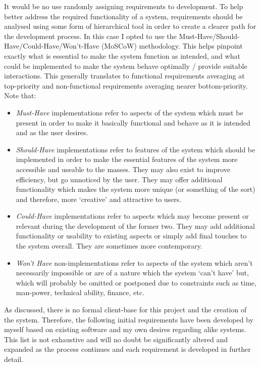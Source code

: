 \documentclass[11pt, english]{article}
\begin{document}
	It would be no use randomly assigning requirements to development. To help better address the required functionality of a system, requirements should be analysed using some form of hierarchical tool in order to create a clearer path for the development process. In this case I opted to use the Must-Have/Should-Have/Could-Have/Won't-Have (MoSCoW) methodology. This helps pinpoint exactly what is essential to make the system function as intended, and what could be implemented to make the system behave optimally / provide suitable interactions. This generally translates to functional requirements averaging at top-priority and non-functional requirements averaging nearer bottom-priority. Note that:

	\begin{itemize}
	\setlength\itemsep{0cm}
		\item \textit{Must-Have} implementations refer to aspects of the system which must be present in order to make it basically functional and behave as it is intended and as the user desires.
		\item \textit{Should-Have} implementations refer to features of the system which should be implemented in order to make the essential features of the system more accessible and useable to the masses. They may also exist to improve efficiency, but go unnoticed by the user. They may offer additional functionality which makes the system more unique (or something of the sort) and therefore, more `creative' and attractive to users.
		\item \textit{Could-Have} implementations refer to aspects which may become present or relevant during the development of the former two. They may add additional functionality or usability to existing aspects or simply add final touches to the system overall. They are sometimes more contemporary.
		\item \textit{Won't Have} non-implementations refer to aspects of the system which aren't necessarily impossible or are of a nature which the system `can't have' but, which will probably be omitted or postponed due to constraints such as time, man-power, technical ability, finance, etc.
	\end{itemize}

	As discussed, there is no formal client-base for this project and the creation of the system. Therefore, the following initial requirements have been developed by myself based on existing software and my own desires regarding alike systems. This list is not exhaustive and will no doubt be significantly altered and expanded as the process continues and each requirement is developed in further detail.
\end{document}
